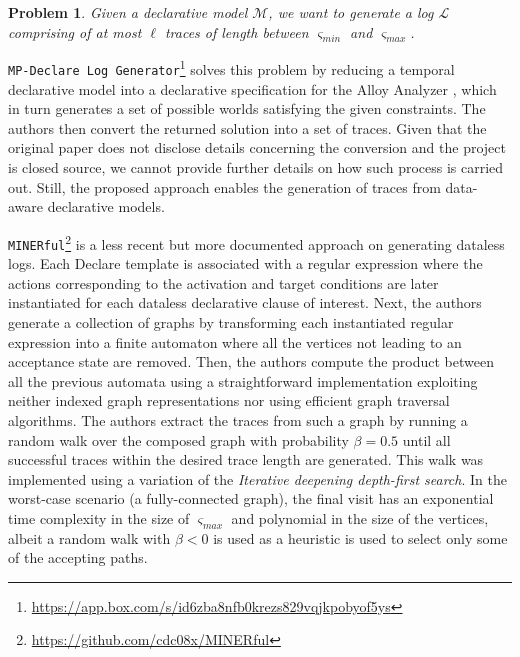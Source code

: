\documentclass[acmengage]{acmart}
\newtheorem{problem}{Problem}
\newcommand{\smin}{\ensuremath{\varsigma_\textit{min}}}
\newcommand{\smax}{\ensuremath{\varsigma_\textit{max}}}
\begin{document}
\begin{problem}\label{problem}
Given a declarative model $\mathcal{M}$, we want to generate a log $\mathcal{L}$ comprising of at most $\ell$ traces of length between $\smin$ and $\smax$.
\end{problem}

\texttt{MP-Declare Log Generator}\footnote{\url{https://app.box.com/s/id6zba8nfb0krezs829vqjkpobyof5ys}} \cite{DBLP:conf/bpm/SkydanienkoFGM18} solves this problem by reducing a temporal declarative model into a declarative specification for the Alloy Analyzer \cite{DBLP:books/daglib/0024034}, which in turn generates a set of possible worlds satisfying the given constraints. The authors then convert the returned solution into a set of traces. Given that  the original paper does not disclose details concerning the conversion 
and the project is closed source, we cannot provide further details on how such process is carried out. Still, the proposed approach enables the generation of traces from data-aware declarative models.

\texttt{MINERful}\footnote{\url{https://github.com/cdc08x/MINERful}} \cite{DBLP:conf/caise/CiccioBCM15} is a less recent but more documented approach on generating dataless logs. Each Declare template is associated with a regular expression where the actions corresponding to the activation and target conditions are later instantiated for each dataless declarative clause of interest. Next, the authors generate a collection of graphs by transforming each  instantiated regular expression into a finite automaton where all the vertices not leading to an acceptance state are removed. Then, the authors compute the product between all the previous automata using a straightforward implementation  exploiting neither indexed graph representations nor using efficient graph traversal algorithms. The authors extract the traces from such a graph by running a random walk over the composed graph with probability  $\beta=0.5$ until all successful traces within the desired trace length are  generated. This walk was implemented using a variation of the \textit{Iterative deepening depth-first search}. In the worst-case scenario (a fully-connected graph), the final visit has an exponential time complexity in the size of $\varsigma_\textit{max}$ and polynomial in the size of the vertices, albeit a random walk with $\beta<0$ is used as a heuristic is used to select only some of the accepting paths.
\end{document}
